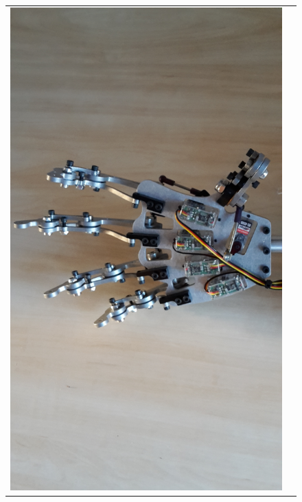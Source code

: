 \documentclass[progress]{cmpreport}
\begin{document}
\begin{figure}[H]
\begin{tabular}{ll}
		\includegraphics[trim=2cm 2cm 3cm 4cm, clip=true, totalheight=0.15\textheight, angle=0]{photos/Day 10.jpg}
	\end{tabular}
\end{figure}
\end{document}
